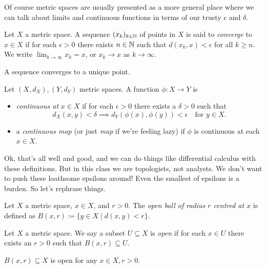 Of course metric spaces are usually presented as a more general place
where we can talk about limits and continuous functions in terms of
our trusty $\epsilon$ and $\delta$.

\begin{definition}
  Let $X$ a metric space. A sequence $(x_k)_{k \in \mathbb{N}}$ of points in
  $X$ is said to \textit{converge} to $x \in X$ if for each $\epsilon
  > 0$ there exists $n \in \mathbb{N}$ such that $d(x_k,x) < \epsilon$ for all
  $k \ge n$. We write $\lim_{k \to \infty} x_k = x$, or $x_k \to x$ as
  $k \to \infty$.
\end{definition}

\begin{exercise}
  A sequence converges to a unique point.
\end{exercise}

\begin{definition}
  Let $(X, d_X), (Y, d_Y)$ metric spaces. A function $\phi : X \to Y$
  is
  \begin{itemize}
  \item \textit{continuous at} $x \in X$ if for each $\epsilon > 0$
    there exists a $\delta > 0$ such that
    \[
    d_X(x,y) < \delta \implies d_Y(\phi(x),\phi(y)) < \epsilon
    \quad\text{for } y \in X.
    \]
  \item a \textit{continuous map} (or just \textit{map} if we're
    feeling lazy) if $\phi$ is continuous at each $x \in X$.
  \end{itemize}
\end{definition}

Ok, that's all well and good, and we can do things like differential
calculus with these definitions. But in this class we are topologists,
not analysts. We don't want to push these loathsome epsilons around!
Even the smallest of epsilons is a burden. So let's rephrase things.

\begin{definition}
  Let $X$ a metric space, $x \in X$, and $r > 0$. The \textit{open
    ball of radius $r$ centred at $x$} is defined as $B(x,r) \coloneqq
  \{y \in X \mid d(x,y) < r\}$.
\end{definition}

\begin{definition}
  Let $X$ a metric space. We say a subset $U \subseteq X$ is
  \emph{open} if for each $x \in U$ there exists an $r > 0$ such that
  $B(x,r) \subseteq U$.
\end{definition}

\begin{exercise}
  $B(x,r) \subseteq X$ is open for any $x \in X, r > 0$.
\end{exercise}

